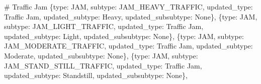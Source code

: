 \documentclass[
  letterpaper,
  DIV=11,
  numbers=noendperiod]{scrartcl}
\newenvironment{Shaded}{\begin{snugshade}}{\end{snugshade}}
\newcommand{\CommentTok}[1]{\textcolor[rgb]{0.37,0.37,0.37}{#1}}
\newcommand{\NormalTok}[1]{\textcolor[rgb]{0.00,0.23,0.31}{#1}}
\newcommand{\StringTok}[1]{\textcolor[rgb]{0.13,0.47,0.30}{#1}}
\newcommand{\VariableTok}[1]{\textcolor[rgb]{0.07,0.07,0.07}{#1}}
\begin{document}
\begin{Shaded}
\begin{Highlighting}[]
    \CommentTok{\# Traffic Jam}
\NormalTok{    \{}\StringTok{\textquotesingle{}type\textquotesingle{}}\NormalTok{: }\StringTok{\textquotesingle{}JAM\textquotesingle{}}\NormalTok{, }\StringTok{\textquotesingle{}subtype\textquotesingle{}}\NormalTok{: }\StringTok{\textquotesingle{}JAM\_HEAVY\_TRAFFIC\textquotesingle{}}\NormalTok{, }
     \StringTok{\textquotesingle{}updated\_type\textquotesingle{}}\NormalTok{: }\StringTok{\textquotesingle{}Traffic Jam\textquotesingle{}}\NormalTok{, }\StringTok{\textquotesingle{}updated\_subtype\textquotesingle{}}\NormalTok{: }\StringTok{\textquotesingle{}Heavy\textquotesingle{}}\NormalTok{, }\StringTok{\textquotesingle{}updated\_subsubtype\textquotesingle{}}\NormalTok{: }\VariableTok{None}\NormalTok{\},}
\NormalTok{    \{}\StringTok{\textquotesingle{}type\textquotesingle{}}\NormalTok{: }\StringTok{\textquotesingle{}JAM\textquotesingle{}}\NormalTok{, }\StringTok{\textquotesingle{}subtype\textquotesingle{}}\NormalTok{: }\StringTok{\textquotesingle{}JAM\_LIGHT\_TRAFFIC\textquotesingle{}}\NormalTok{, }
     \StringTok{\textquotesingle{}updated\_type\textquotesingle{}}\NormalTok{: }\StringTok{\textquotesingle{}Traffic Jam\textquotesingle{}}\NormalTok{, }\StringTok{\textquotesingle{}updated\_subtype\textquotesingle{}}\NormalTok{: }\StringTok{\textquotesingle{}Light\textquotesingle{}}\NormalTok{, }\StringTok{\textquotesingle{}updated\_subsubtype\textquotesingle{}}\NormalTok{: }\VariableTok{None}\NormalTok{\},}
\NormalTok{    \{}\StringTok{\textquotesingle{}type\textquotesingle{}}\NormalTok{: }\StringTok{\textquotesingle{}JAM\textquotesingle{}}\NormalTok{, }\StringTok{\textquotesingle{}subtype\textquotesingle{}}\NormalTok{: }\StringTok{\textquotesingle{}JAM\_MODERATE\_TRAFFIC\textquotesingle{}}\NormalTok{, }
     \StringTok{\textquotesingle{}updated\_type\textquotesingle{}}\NormalTok{: }\StringTok{\textquotesingle{}Traffic Jam\textquotesingle{}}\NormalTok{, }\StringTok{\textquotesingle{}updated\_subtype\textquotesingle{}}\NormalTok{: }\StringTok{\textquotesingle{}Moderate\textquotesingle{}}\NormalTok{, }\StringTok{\textquotesingle{}updated\_subsubtype\textquotesingle{}}\NormalTok{: }\VariableTok{None}\NormalTok{\},}
\NormalTok{    \{}\StringTok{\textquotesingle{}type\textquotesingle{}}\NormalTok{: }\StringTok{\textquotesingle{}JAM\textquotesingle{}}\NormalTok{, }\StringTok{\textquotesingle{}subtype\textquotesingle{}}\NormalTok{: }\StringTok{\textquotesingle{}JAM\_STAND\_STILL\_TRAFFIC\textquotesingle{}}\NormalTok{, }
     \StringTok{\textquotesingle{}updated\_type\textquotesingle{}}\NormalTok{: }\StringTok{\textquotesingle{}Traffic Jam\textquotesingle{}}\NormalTok{, }\StringTok{\textquotesingle{}updated\_subtype\textquotesingle{}}\NormalTok{: }\StringTok{\textquotesingle{}Standstill\textquotesingle{}}\NormalTok{, }\StringTok{\textquotesingle{}updated\_subsubtype\textquotesingle{}}\NormalTok{: }\VariableTok{None}\NormalTok{\},}
    

\end{Highlighting}
\end{Shaded}
\end{document}
